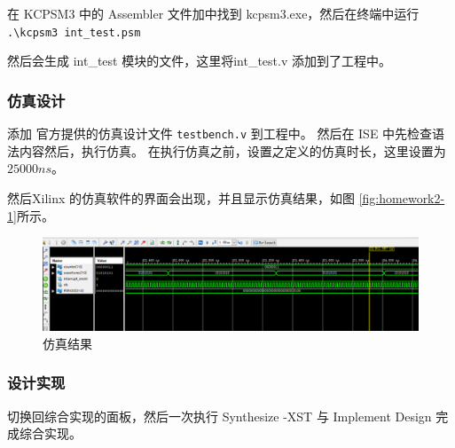 \documentclass{ctexart}
\begin{document}
在 KCPSM3 中的 Assembler 文件加中找到 kcpsm3.exe，然后在终端中运行 \lstinline|.\kcpsm3 int_test.psm|

然后会生成 int\_test 模块的文件，这里将int\_test.v 添加到了工程中。

\subsubsection{仿真设计}

添加 官方提供的仿真设计文件 \verb|testbench.v| 到工程中。 然后在 ISE 中先检查语法内容然后，执行仿真。
在执行仿真之前，设置之定义的仿真时长，这里设置为 $25000ns$。

然后Xilinx 的仿真软件的界面会出现，并且显示仿真结果，如图 \ref{fig:homework2-1}所示。

\begin{figure}
\centering
\includegraphics[width=0.7\linewidth]{homework2-1}
\caption{仿真结果}
\label{fig:report3-4}
\end{figure}


\subsubsection{设计实现}

切换回综合实现的面板，然后一次执行 Synthesize -XST 与 Implement Design 完成综合实现。
\end{document}
